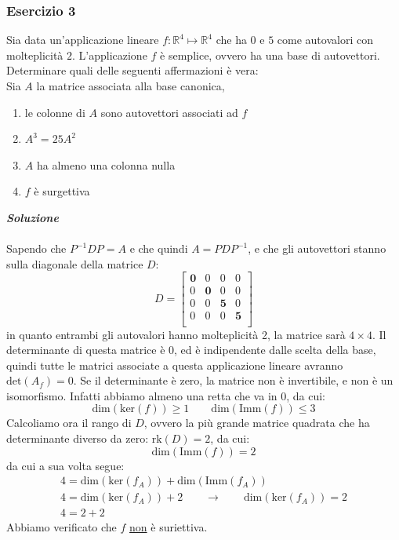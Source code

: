 \documentclass[italian]{article}
\newcommand{\ins}[1]{\text{$\mathbb{#1}$}}
\renewcommand{\dim}[1]{\text{dim$\left(#1\right)$}}
\renewcommand{\ker}[1]{\text{ker$\left(#1\right)$}}
\newcommand{\imm}[1]{\text{Imm$\left(#1\right)$}}
\renewcommand{\det}[1]{\text{det$\left(#1\right)$}}
\newcommand{\rk}[1]{\text{rk$\left(#1\right)$}}
\begin{document}
\subsubsection{Esercizio 3}
Sia data un'applicazione lineare $f: \ins{R}^4 \longmapsto \ins{R}^4$ che ha $0$ e $5$ come autovalori con molteplicità $2$. L'applicazione $f$ è semplice, ovvero ha una base di autovettori. Determinare quali delle seguenti affermazioni è vera:\\[2mm]Sia $A$ la matrice associata alla base canonica,
\begin{enumerate}[label=\alph*)]
	\item le colonne di $A$ sono autovettori associati ad $f$
	\item $A^3 = 25A^2$
	\item $A$ ha almeno una colonna nulla
	\item $f$ è surgettiva
\end{enumerate}
\textbf{\textit{Soluzione}}\\\\
Sapendo che $P^{-1}DP = A$ e che quindi $A = PDP^{-1}$, e che gli autovettori stanno sulla diagonale della matrice $D$:
\[
	D = 
	\begin{bmatrix}
		\textbf{0} & 0 & 0 & 0 \\
		0 & \textbf{0} & 0 & 0 \\
		0 & 0 & \textbf{5} & 0 \\
		0 & 0 & 0 & \textbf{5}\\
	\end{bmatrix}
\]
in quanto entrambi gli autovalori hanno molteplicità 2, la matrice sarà $4\times 4$. Il determinante di questa matrice è 0, ed è indipendente dalle scelta della base, quindi tutte le matrici associate a questa applicazione lineare avranno $\det{A_f} = 0$. Se il determinante è zero, la matrice non è invertibile, e non è un isomorfismo. Infatti abbiamo almeno una retta che va in 0, da cui:
\[
	\dim{\ker{f}} \geq 1 \qquad \dim{\imm{f}} \leq 3
\]
Calcoliamo ora il rango di $D$, ovvero la più grande matrice quadrata che ha determinante diverso da zero: $\rk{D} = 2$, da cui:
\[
	\dim{\imm{f}} = 2
\]
da cui a sua volta segue: 
\begin{gather*}
	4 = \dim{\ker{f_A}} + \dim{\imm{f_A}} \\
	4 = \dim{\ker{f_A}} + 2 \qquad \to \qquad \dim{\ker{f_A}} = 2 \\
	4 = 2 + 2
\end{gather*}
Abbiamo verificato che $f$ \underline{non} è suriettiva.\\\\
\end{document}
